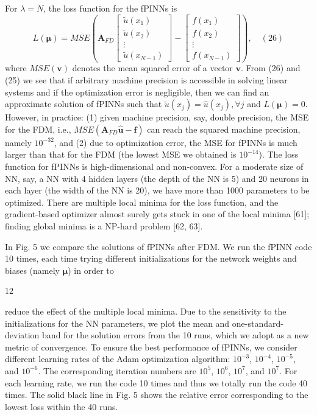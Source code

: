 \documentclass[UTF8]{article}
\begin{document}
For $\lambda = N$, the loss function for the fPINNs is
$$
L(\boldsymbol{\mu}) = MSE \left( \mathbf{A}_{FD} \left[ \begin{array}{c} \tilde{u}(x_1) \\ \tilde{u}(x_2) \\ \vdots \\ \tilde{u}(x_{N-1}) \end{array} \right] - \left[ \begin{array}{c} f(x_1) \\ f(x_2) \\ \vdots \\ f(x_{N-1}) \end{array} \right] \right), \quad (26)
$$
where $MSE(\mathbf{v})$ denotes the mean squared error of a vector $\mathbf{v}$. From (26) and (25) we see that if arbitrary machine precision is accessible in solving linear systems and if the optimization error is negligible, then we can find an approximate solution of fPINNs such that $\tilde{u}(x_j) = \hat{u}(x_j), \forall j$ and $L(\boldsymbol{\mu}) = 0$. However, in practice: (1) given machine precision, say, double precision, the MSE for the FDM, i.e., $MSE(\mathbf{A}_{FD}\hat{\mathbf{u}} - \mathbf{f})$ can reach the squared machine precision, namely $10^{-32}$, and (2) due to optimization error, the MSE for fPINNs is much larger than that for the FDM (the lowest MSE we obtained is $10^{-14}$). The loss function for fPINNs is high-dimensional and non-convex. For a moderate size of NN, say, a NN with 4 hidden layers (the depth of the NN is 5) and 20 neurons in each layer (the width of the NN is 20), we have more than 1000 parameters to be optimized. There are multiple local minima for the loss function, and the gradient-based optimizer almost surely gets stuck in one of the local minima [61]; finding global minima is a NP-hard problem [62, 63].

In Fig. 5 we compare the solutions of fPINNs after FDM. We run the fPINN code 10 times, each time trying different initializations for the network weights and biases (namely $\boldsymbol{\mu}$) in order to

12

reduce the effect of the multiple local minima. Due to the sensitivity to the initializations for the NN parameters, we plot the mean and one-standard-deviation band for the solution errors from the 10 runs, which we adopt as a new metric of convergence. To ensure the best performance of fPINNs, we consider different learning rates of the Adam optimization algorithm: $10^{-3}$, $10^{-4}$, $10^{-5}$, and $10^{-6}$. The corresponding iteration numbers are $10^5$, $10^6$, $10^7$, and $10^7$. For each learning rate, we run the code 10 times and thus we totally run the code 40 times. The solid black line in Fig. 5 shows the relative error corresponding to the lowest loss within the 40 runs.
\end{document}
